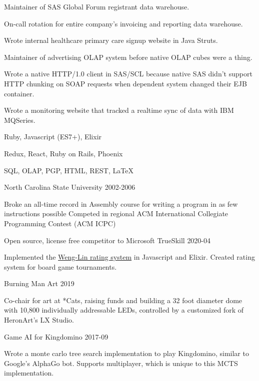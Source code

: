 \documentclass[11pt,english]{article}
\begin{document}
\begin{description}
Maintainer of SAS Global Forum registrant data warehouse.

On-call rotation for entire company's invoicing and reporting data warehouse.

Wrote internal healthcare primary care signup website in Java Struts.

Maintainer of advertising OLAP system before native OLAP cubes were a thing.

Wrote a native HTTP/1.0 client in SAS/SCL because native SAS didn't support HTTP chunking on SOAP requests when dependent system changed their EJB container.

Wrote a monitoring website that tracked a realtime sync of data with IBM MQSeries.

\end{description}


      {Ruby, Javascript (ES7+), Elixir}

      {Redux, React, Ruby on Rails, Phoenix}

      {SQL, OLAP, PGP, HTML, REST, \LaTeX}


\begin{description}
\squish
{} {North Carolina State University}
           {2002-2006}
 
Broke an all-time record in Assembly course for writing a program in as few instructions possible
Competed in regional ACM International Collegiate Programming Contest (ACM ICPC)

\end{description}


\begin{description}
\squish

           {Open source, license free competitor to Microsoft TrueSkill}
           {2020-04}

Implemented the \href{https://www.csie.ntu.edu.tw/~cjlin/papers/online_ranking/online_journal.pdf}{Weng-Lin rating system} in Javascript and Elixir. Created rating system for board game tournaments.

           {Burning Man Art}
           {2019}

Co-chair for art at *Cats, raising funds and building a 32 foot diameter dome with 10,800 individually addressable LEDs, controlled by a customized fork of HeronArt's LX Studio.

           {Game AI for Kingdomino}
           {2017-09}

Wrote a monte carlo tree search implementation to play Kingdomino, similar to
Google's AlphaGo bot. Supports multiplayer, which is unique to this MCTS
implementation.

\end{description}
\end{document}

